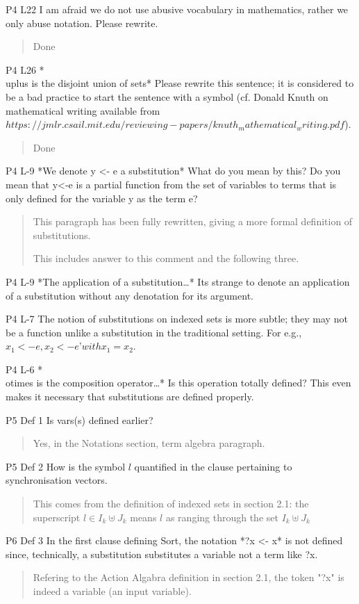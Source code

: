 \documentclass{article}
\begin{document}
P4 L22 I am afraid we do not use abusive vocabulary in mathematics, rather we only abuse notation. Please rewrite.
\begin{quote}
Done
\end{quote}

P4 L26 *\\uplus is the disjoint union of sets* Please rewrite this sentence; it is considered to be a bad practice to start the sentence with a symbol (cf. Donald Knuth on mathematical writing available from $https://jmlr.csail.mit.edu/reviewing-papers/knuth_mathematical_writing.pdf$).
\begin{quote}
Done
\end{quote}


P4 L-9 *We denote y <- e a substitution* What do you mean by this? Do you mean that y<-e is a partial function from the set of variables to terms that is only defined for the variable y as the term e?
\begin{quote}
This paragraph has been fully rewritten, giving a more formal definition of substitutions.

This includes answer to this comment and the following three. 
\end{quote}


P4 L-9 *The application of a substitution…* Its strange to denote an application of a substitution without any denotation for its argument.

P4 L-7 The notion of substitutions on indexed sets is more subtle; they may not be a function unlike a substitution in the traditional setting. For e.g., $x_1 <-e, x_2 <-e’ with x_1 = x_2$.

P4 L-6 *\\otimes is the composition operator…* Is this operation totally defined? This even makes it necessary that substitutions are defined properly.

P5 Def 1 Is vars(s) defined earlier?
\begin{quote}
Yes, in the Notations section, term algebra paragraph.
\end{quote}

P5 Def 2 How is the symbol $l$ quantified in the clause pertaining to synchronisation vectors.
\begin{quote}
This comes from the definition of indexed sets in section 2.1: the superscript $l\in I_k\uplus J_k$ means $l$ as ranging through the set $I_k\uplus J_k$
\end{quote}

P6 Def 3 In the first clause defining Sort, the notation *?x <- x* is not defined since, technically, a substitution substitutes a variable not a term like ?x.
\begin{quote}
Refering to the Action Algabra definition in section 2.1, the token "?x" is indeed a variable (an input variable).
\end{quote}
\end{document}
